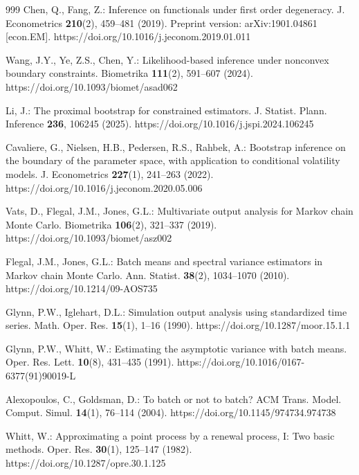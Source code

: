 \begin{thebibliography}{999}
Chen, Q., Fang, Z.: Inference on functionals under first order degeneracy.
J. Econometrics \textbf{210}(2), 459--481 (2019). Preprint version:
arXiv:1901.04861 [econ.EM].
https://doi.org/10.1016/j.jeconom.2019.01.011

Wang, J.Y., Ye, Z.S., Chen, Y.: Likelihood-based inference under nonconvex
boundary constraints. Biometrika \textbf{111}(2), 591--607 (2024).
https://doi.org/10.1093/biomet/asad062

Li, J.: The proximal bootstrap for constrained estimators. J. Statist. Plann.
Inference \textbf{236}, 106245 (2025).
https://doi.org/10.1016/j.jspi.2024.106245

Cavaliere, G., Nielsen, H.B., Pedersen, R.S., Rahbek, A.: Bootstrap inference
on the boundary of the parameter space, with application to conditional
volatility models. J. Econometrics \textbf{227}(1), 241--263 (2022).
https://doi.org/10.1016/j.jeconom.2020.05.006

Vats, D., Flegal, J.M., Jones, G.L.: Multivariate output analysis for Markov chain Monte Carlo. Biometrika \textbf{106}(2), 321--337 (2019). https://doi.org/10.1093/biomet/asz002

Flegal, J.M., Jones, G.L.: Batch means and spectral variance estimators in Markov chain Monte Carlo. Ann. Statist. \textbf{38}(2), 1034--1070 (2010). https://doi.org/10.1214/09-AOS735

Glynn, P.W., Iglehart, D.L.: Simulation output analysis using standardized time series. Math. Oper. Res. \textbf{15}(1), 1--16 (1990). https://doi.org/10.1287/moor.15.1.1

Glynn, P.W., Whitt, W.: Estimating the asymptotic variance with batch means. Oper. Res. Lett. \textbf{10}(8), 431--435 (1991). https://doi.org/10.1016/0167-6377(91)90019-L

Alexopoulos, C., Goldsman, D.: To batch or not to batch? ACM Trans. Model. Comput. Simul. \textbf{14}(1), 76--114 (2004). https://doi.org/10.1145/974734.974738

Whitt, W.: Approximating a point process by a renewal process, I: Two basic methods. Oper. Res. \textbf{30}(1), 125--147 (1982). https://doi.org/10.1287/opre.30.1.125


\end{thebibliography}
